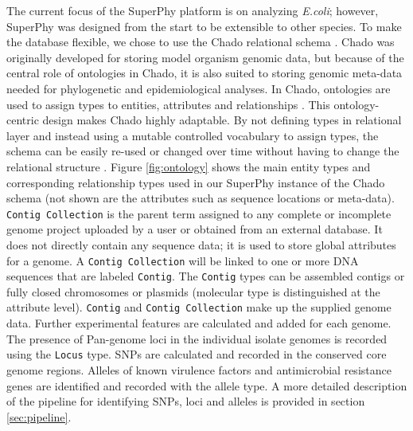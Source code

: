 \documentclass[a4paper,twoside]{article}
\begin{document}
The current focus of the SuperPhy platform is on analyzing \textit{E.coli}; however, SuperPhy was designed from the start to be extensible to other species. To make the database flexible, we chose to use the Chado relational schema \cite{mungall2007chado}. Chado was originally developed for storing model organism genomic data, but because of the central role of ontologies in Chado, it is also suited to storing genomic meta-data needed for phylogenetic and epidemiological analyses. In Chado, ontologies are used to assign types to entities, attributes and relationships \cite{mungall2007chado}. This ontology-centric design makes Chado highly adaptable. By not defining types in relational layer and instead using a mutable controlled vocabulary to assign types, the schema can be easily re-used or changed over time without having to change the relational structure \cite{mungall2007chado}.  Figure \ref{fig:ontology} shows the main entity types and corresponding relationship types used in our SuperPhy instance of the Chado schema (not shown are the attributes such as sequence locations or  meta-data). \texttt{Contig Collection} is the parent term assigned to any complete or incomplete genome project uploaded by a user or obtained from an external database.  It does not directly contain any sequence data; it is used to store global attributes for a genome. A \texttt{Contig Collection} will be linked to one or more DNA sequences that are labeled \texttt{Contig}. The \texttt{Contig} types can be assembled contigs or fully closed chromosomes or plasmids (molecular type is distinguished at the attribute level). \texttt{Contig} and \texttt{Contig Collection} make up the supplied genome data. Further experimental features are calculated and added for each genome. The presence of Pan-genome loci in the individual isolate genomes is recorded using the \texttt{Locus} type. SNPs are calculated and recorded in the conserved core genome regions. Alleles of known virulence factors and antimicrobial resistance genes are identified and recorded with the allele type.  A more detailed description of the pipeline for identifying SNPs, loci and alleles is provided in section \ref{sec:pipeline}.

\begin{figure*}[t]
  \vspace{-0.2cm}
  \centering
   {}
  \caption{A ontology graph representing the main feature types used in the SuperPhy schema.}
  \label{fig:ontology}
\end{figure*}
\end{document}
